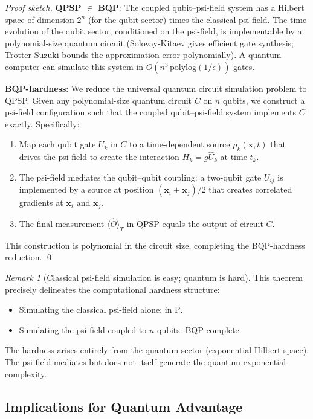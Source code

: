 \documentclass[11pt]{article}
\theoremstyle{definition}
\theoremstyle{remark}
\newtheorem{remark}[theorem]{Remark}
\begin{document}
\begin{proof}[Proof sketch]
\textbf{QPSP $\in$ BQP}: The coupled qubit--psi-field system has a
Hilbert space of dimension $2^n$ (for the qubit sector) times the
classical psi-field. The time evolution of the qubit sector, conditioned
on the psi-field, is implementable by a polynomial-size quantum circuit
(Solovay-Kitaev gives efficient gate synthesis; Trotter-Suzuki bounds the
approximation error polynomially). A quantum computer can simulate this
system in $O(n^3\,\mathrm{polylog}(1/\epsilon))$ gates.

\textbf{BQP-hardness}: We reduce the universal quantum circuit simulation
problem to QPSP. Given any polynomial-size quantum circuit $C$ on $n$
qubits, we construct a psi-field configuration such that the coupled
qubit--psi-field system implements $C$ exactly. Specifically:
\begin{enumerate}[label=(\roman*)]
\item Map each qubit gate $U_k$ in $C$ to a time-dependent source
  $\rho_k(\mathbf{x},t)$ that drives the psi-field to create the
  interaction $H_k = g\hat{U}_k$ at time $t_k$.
\item The psi-field mediates the qubit--qubit coupling: a two-qubit gate
  $U_{ij}$ is implemented by a source at position $(\mathbf{x}_i+\mathbf{x}_j)/2$
  that creates correlated gradients at $\mathbf{x}_i$ and $\mathbf{x}_j$.
\item The final measurement $\langle\hat{O}\rangle_T$ in QPSP equals the
  output of circuit $C$.
\end{enumerate}
This construction is polynomial in the circuit size, completing the
BQP-hardness reduction. \qed
\end{proof}

\begin{remark}[Classical psi-field simulation is easy; quantum is hard]
This theorem precisely delineates the computational hardness structure:
\begin{itemize}[nosep]
\item Simulating the classical psi-field alone: in \textsc{P}.
\item Simulating the psi-field coupled to $n$ qubits: BQP-complete.
\end{itemize}
The hardness arises entirely from the quantum sector (exponential Hilbert
space). The psi-field mediates but does not itself generate the quantum
exponential complexity.
\end{remark}

\subsection{Implications for Quantum Advantage}
\end{document}

